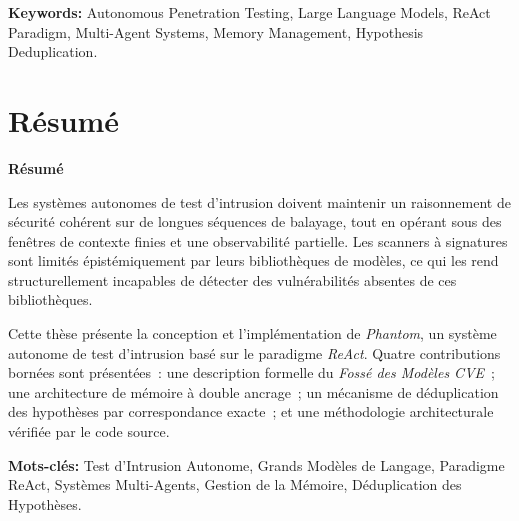 \documentclass[12pt, a4paper, oneside, openany]{book}
\newcommand{\Phant}{\textit{Phantom}}
\begin{document}
\vspace{0.5cm}
\noindent\textbf{Keywords:} Autonomous Penetration Testing, Large Language Models,
ReAct Paradigm, Multi-Agent Systems, Memory Management, Hypothesis Deduplication.

\cleardoublepage

\chapter*{R\'{e}sum\'{e}}
\vspace{0.5cm}
\begin{center}
\textbf{\Large R\'{e}sum\'{e}}
\end{center}
\vspace{0.5cm}

Les syst\`{e}mes autonomes de test d'intrusion doivent maintenir un
raisonnement de s\'{e}curit\'{e} coh\'{e}rent sur de longues s\'{e}quences
de balayage, tout en op\'{e}rant sous des fen\^{e}tres de contexte finies
et une observabilit\'{e} partielle.  Les scanners \`{a} signatures sont
limit\'{e}s \'{e}pist\'{e}miquement par leurs biblioth\`{e}ques de
mod\`{e}les, ce qui les rend structurellement incapables de d\'{e}tecter
des vuln\'{e}rabilit\'{e}s absentes de ces biblioth\`{e}ques.

Cette th\`{e}se pr\'{e}sente la conception et l'impl\'{e}mentation de
\Phant{}, un syst\`{e}me autonome de test d'intrusion bas\'{e} sur le
paradigme \textit{ReAct}.  Quatre contributions born\'{e}es sont
pr\'{e}sent\'{e}es~: une description formelle du \textit{Foss\'{e} des
Mod\`{e}les CVE}~; une architecture de m\'{e}moire \`{a} double ancrage~;
un m\'{e}canisme de d\'{e}duplication des hypoth\`{e}ses par
correspondance exacte~; et une m\'{e}thodologie architecturale
v\'{e}rifi\'{e}e par le code source.

\vspace{0.5cm}
\noindent\textbf{Mots-cl\'{e}s:} Test d'Intrusion Autonome, Grands
Mod\`{e}les de Langage, Paradigme ReAct, Syst\`{e}mes Multi-Agents,
Gestion de la M\'{e}moire, D\'{e}duplication des Hypoth\`{e}ses.

\cleardoublepage

\tableofcontents
\cleardoublepage

\listoffigures
{}
\cleardoublepage
\end{document}
